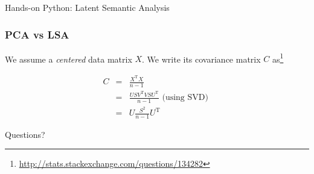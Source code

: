 \documentclass[compress,mathserif,t]{beamer} %
\begin{document}
\begin{frame}[plain,c]
	
	\begin{center}
		
		Hands-on Python: Latent Semantic 
		Analysis 
		
	\end{center}
	
\end{frame}

\begin{frame}
\frametitle{PCA vs LSA}
We assume a \textsl{centered} data matrix $X$. We write its  
covariance matrix $C$  
as\footnote{\url{http://stats.stackexchange.com/questions/134282}}
 
\begin{eqnarray}
C &=& \frac{X^\text{T} X}{n - 1} \\ 
  &=& \frac{USV^\text{T} 
  VSU^\text{T}}{n - 1} 
\text{ (using SVD) } \\ 
	&=& U\frac{S^2}{n - 
	1}U^\text{T}
\label{eq:}
\end{eqnarray}

\end{frame}

\begin{frame}[plain,c]
	
	\begin{center}
		
		\Huge Questions? 
		
	\end{center}
	
\end{frame}
\end{document}
